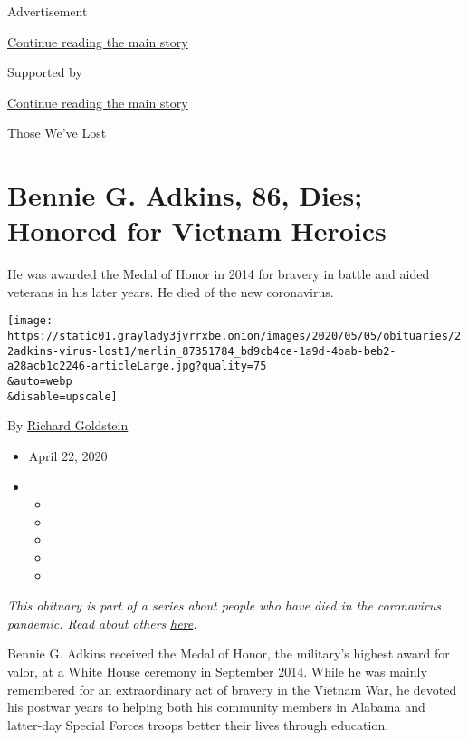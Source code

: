 Advertisement

\protect\hyperlink{after-top}{Continue reading the main story}

Supported by

\protect\hyperlink{after-sponsor}{Continue reading the main story}

Those We've Lost

\hypertarget{bennie-g-adkins-86-dies-honored-for-vietnam-heroics}{%
\section{Bennie G. Adkins, 86, Dies; Honored for Vietnam
Heroics}\label{bennie-g-adkins-86-dies-honored-for-vietnam-heroics}}

He was awarded the Medal of Honor in 2014 for bravery in battle and
aided veterans in his later years. He died of the new coronavirus.

\texttt{[image: https://static01.graylady3jvrrxbe.onion/images/2020/05/05/obituaries/22adkins-virus-lost1/merlin\_87351784\_bd9cb4ce-1a9d-4bab-beb2-a28acb1c2246-articleLarge.jpg?quality=75\\\&auto=webp\\\&disable=upscale]}

By
\href{https://www.nytimes3xbfgragh.onion/by/richard-goldstein}{Richard
Goldstein}

\begin{itemize}
\item
  April 22, 2020
\item
  \begin{itemize}
  \item
  \item
  \item
  \item
  \item
  \end{itemize}
\end{itemize}

\emph{This obituary is part of a series about people who have died in
the coronavirus pandemic. Read about others}
\href{https://www.nytimes3xbfgragh.onion/series/people-who-have-died-of-the-coronavirus}{\emph{here}}\emph{.}

Bennie G. Adkins received the Medal of Honor, the military's highest
award for valor, at a White House ceremony in September 2014. While he
was mainly remembered for an extraordinary act of bravery in the Vietnam
War, he devoted his postwar years to helping both his community members
in Alabama and latter-day Special Forces troops better their lives
through education.

